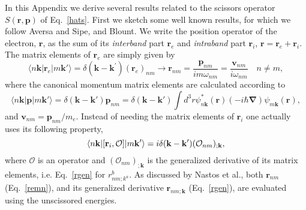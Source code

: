 \documentclass[floatfix,prb,aps,superscriptaddress,11pt]{revtex4}
\begin{document}
In this Appendix we derive several results related to the scissors operator 
$S(\mathbf{r},\mathbf{p})$ of Eq.~\eqref{hats}. First we sketch some well known results,
for which we follow Aversa and Sipe,\cite{aversaPRB95}
 and 
Blount.\cite{blountSSP62} 
We write the position
operator of the electron, $\mathbf{r}$, as the sum of its \textit{interband} part 
$\mathbf{r}_{e}$ and \textit{intraband} part $\mathbf{r}_{i}$, $\mathbf{r}=\mathbf{r}_{e}+\mathbf{r}_{i}$.
The matrix elements of $\mathbf{r}_{e}$ are simply given by\cite{aversaPRB95} 
\begin{equation}
\langle n\mathbf{k}|\mathbf{r}_{e}|m\mathbf{k}'\rangle=\delta(\mathbf{k}-\mathbf{k}^{\prime })(\mathbf{r}
_{e})_{nm}\rightarrow \mathbf{r}_{nm}=\frac{\mathbf{p}_{nm}}{im\omega_{nm}}=\frac{\mathbf{v}_{nm}
}{i\omega_{nm}}\quad n\neq m,  \label{remn}
\end{equation}
where the canonical momentum matrix elements are calculated according to 
\begin{equation*}\label{pmn}
\langle n\mathbf{k}|\mathbf{p}|m\mathbf{k}'\rangle=\delta(\mathbf{k}-\mathbf{k}')\mathbf{p}_{nm}
=\delta(\mathbf{k}-\mathbf{k}')\int d^3r
\psi_{n\mathbf{k}}^*(\mathbf{r})(-i\hbar\boldsymbol{\nabla}) \psi_{m\mathbf{k}}(\mathbf{r})
,
\end{equation*}
and $\mathbf{v}_{nm}=\mathbf{p}_{nm}/m_e$. Instead of needing the matrix elements of $\mathbf{r}%
_{i}$ one actually uses its following property,\cite{aversaPRB95} 
\begin{equation}
\langle n\mathbf{k}|[\mathbf{r}_i,{\cal O}]|m\mathbf{k}'\rangle=i\delta(\mathbf{k}-\mathbf{k}^{\prime })(\mathcal{O}_{nm})_{;\mathbf{k}},  \label{re}
\end{equation}
where $\mathcal{O}$ is an operator and $(\mathcal{O}_{nm})_{;\mathbf{k}}$ is the
generalized derivative of its matrix elements, i.e. Eq.~\eqref{rgen}
 for $r_{nm;k^{a}}^{b}$. As discussed by Nastos et al.\cite{nastosPRB05},
 both $\mathbf{r}_{nm}$ (Eq.~\eqref{remn}), and its
generalized derivative $\mathbf{r}_{nm;\mathbf{k}}$ (Eq.~\eqref{rgen}), are evaluated
using the unscissored energies.
\end{document}
